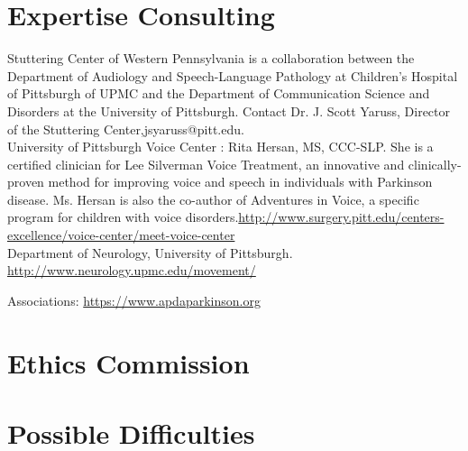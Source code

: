 \section{Expertise Consulting}

Stuttering Center of Western Pennsylvania is a collaboration between the Department of Audiology and Speech-Language Pathology at Children's Hospital of Pittsburgh of UPMC and the Department of Communication Science and Disorders at the University of Pittsburgh. Contact Dr. J. Scott Yaruss, Director of the Stuttering Center,jsyaruss@pitt.edu.\\


University of Pittsburgh Voice Center : Rita Hersan, MS, CCC-SLP. She is a certified clinician for Lee Silverman Voice Treatment, an innovative and clinically-proven method for improving voice and speech in individuals with Parkinson disease. Ms. Hersan is also the co-author of Adventures in Voice, a specific program for children with voice disorders.\url{http://www.surgery.pitt.edu/centers-excellence/voice-center/meet-voice-center}
\\

Department of Neurology, University of Pittsburgh.
\url{http://www.neurology.upmc.edu/movement/}



Associations:
\url{https://www.apdaparkinson.org}


\section{Ethics Commission}

\section{Possible Difficulties}